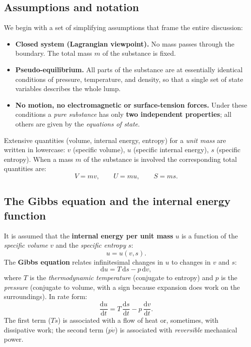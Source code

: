 \subsection{Assumptions and notation}
\label{ssec:thermo_assumptions}

We begin with a set of simplifying assumptions that frame the entire
discussion:
\begin{itemize}[leftmargin=2em,itemsep=4pt]
  \item \textbf{Closed system (Lagrangian viewpoint).}  No mass passes
    through the boundary.  The total mass $m$ of the substance is fixed.
  \item \textbf{Pseudo-equilibrium.}  All parts of the substance are at
    essentially identical conditions of pressure, temperature, and density,
    so that a single set of state variables describes the whole lump.
  \item \textbf{No motion, no electromagnetic or surface-tension forces.}
    Under these conditions a \emph{pure substance} has only
    \textbf{two independent properties}; all others are given by the
    \emph{equations of state}.
\end{itemize}

Extensive quantities (volume, internal energy, entropy) for a \emph{unit
mass} are written in lowercase: $v$ (specific volume), $u$ (specific
internal energy), $s$ (specific entropy).  When a mass $m$ of the substance
is involved the corresponding total quantities are:
\begin{equation}
  V = mv, \qquad U = mu, \qquad S = ms.
  \label{eq:extensive}
\end{equation}


\subsection{The Gibbs equation and the internal energy function}
\label{ssec:gibbs}

It is assumed that the \textbf{internal energy per unit mass} $u$ is a
function of the \emph{specific volume} $v$ and the \emph{specific entropy}
$s$:
\begin{equation}
  u = u(v, s).
  \label{eq:int_energy}
\end{equation}
The \textbf{Gibbs equation} relates infinitesimal changes in $u$ to
changes in $v$ and $s$:
\begin{equation}
  \mathrm{d}u = T\,\mathrm{d}s - p\,\mathrm{d}v,
  \label{eq:gibbs}
\end{equation}
where $T$ is the \emph{thermodynamic temperature} (conjugate to entropy)
and $p$ is the \emph{pressure} (conjugate to volume, with a sign because
expansion does work on the surroundings).  In rate form:
\begin{equation}
  \frac{\mathrm{d}u}{\mathrm{d}t}
  = T\,\frac{\mathrm{d}s}{\mathrm{d}t} - p\,\frac{\mathrm{d}v}{\mathrm{d}t}.
  \label{eq:gibbs_rate}
\end{equation}
The first term ($T\dot{s}$) is associated with a flow of heat or,
sometimes, with dissipative work; the second term ($p\dot{v}$) is
associated with \emph{reversible} mechanical power.

